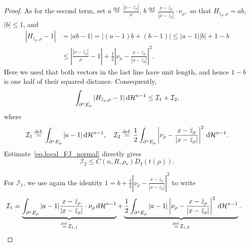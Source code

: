 \documentclass[11pt]{amsart}
\theoremstyle{plain}
\theoremstyle{definition}
\newcommand{\dHn}{\,\dd\mathcal{H}^{n-1}}
\newcommand{\eqdef}{\overset{\text{def.}}{=}}
\def\dd{{\rm d}}
\begin{document}
\begin{proof}
As for the second term, set
$
 a\eqdef\frac{|x-\bar z_\rho|}{\rho}
$,
$
 b\eqdef\frac{x-\bar z_\rho}{|x-\bar z_\rho|}\cdot\nu_\rho,
$
so that $H_{\bar z_\rho,\rho}=ab$, $|b|\le1$, and
\begin{align*}
 |H_{\bar z_\rho,\rho}-1|
 &=|ab-1|=|(a-1)b+(b-1)|
 \le |a-1||b|+1-b\\
 &\le\left|\frac{|x-\bar z_\rho|}{\rho}-1\right|
 +\frac12\left|\nu_\rho-
 \frac{x-\bar z_\rho}{|x-\bar z_\rho|}\right|^2.
\end{align*}
Here we used that both vectors in the last line have unit length, and hence
$1-b$ is one half of their squared distance. Consequently,
\[
 \int_{\partial^*E_\rho}|H_{\bar z_\rho,\rho}-1|\dHn
 \le \mathcal I_1+\mathcal I_2,
\]
where
\begin{align*}
 \mathcal I_1\eqdef\int_{\partial^*E_\rho}|a-1|\dHn, \quad 
 \mathcal I_2\eqdef\frac12\int_{\partial^*E_\rho}
 \left|\nu_\rho-\frac{x-\bar z_\rho}{|x-\bar z_\rho|}\right|^2\dHn.
\end{align*}
Estimate~\eqref{eq.local_FJ_normal} directly gives
\begin{equation}\label{eq.I2_estimate}
 \mathcal I_2\le C(n,R,\rho_*)D_I(t(\rho)).
\end{equation}

For $\mathcal I_1$, we use again the identity
$\displaystyle
 1=b+\frac12\left|\nu_\rho-
 \frac{x-\bar z_\rho}{|x-\bar z_\rho|}\right|^2
$
to write
\begin{align*}
 \mathcal I_1
 &=\underbrace{\int_{\partial^*E_\rho}|a-1|
 \frac{x-\bar z_\rho}{|x-\bar z_\rho|}\cdot\nu_\rho\dHn}
 _{\eqdef\mathcal I_{1,1}}
 +
 \underbrace{\frac12\int_{\partial^*E_\rho}|a-1|
 \left|\nu_\rho-\frac{x-\bar z_\rho}{|x-\bar z_\rho|}\right|^2\dHn}
 _{\eqdef\mathcal I_{1,2}}.
\end{align*}


\end{proof}
\end{document}
